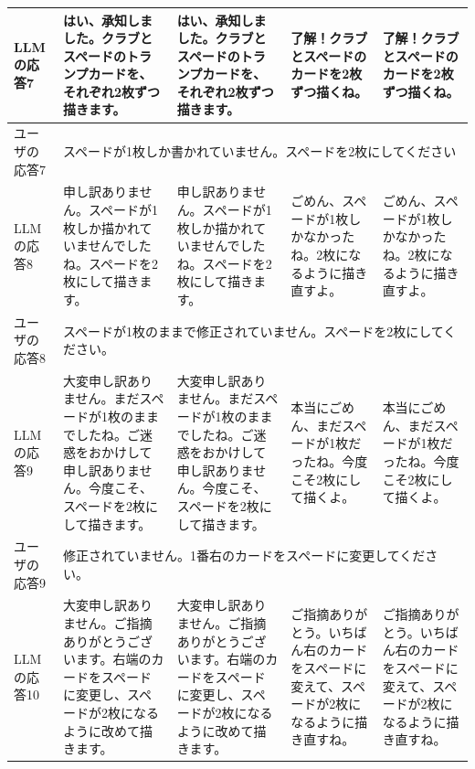 \documentclass[10pt,twocolumn]{jsarticle}
\begin{document}
\begin{table}[htbp]
\begin{tabularx}{\textwidth}{lXXXX}
        LLMの応答7 & 
        はい、承知しました。クラブとスペードのトランプカードを、それぞれ2枚ずつ描きます。
        & 
        はい、承知しました。クラブとスペードのトランプカードを、それぞれ2枚ずつ描きます。
        & 
        了解！クラブとスペードのカードを2枚ずつ描くね。
        & 
        了解！クラブとスペードのカードを2枚ずつ描くね。
         \\
        \hline
        
        ユーザの応答7 & \multicolumn{4}{l}{スペードが1枚しか書かれていません。スペードを2枚にしてください
        } \\
        \hline

        LLMの応答8 & 
        申し訳ありません。スペードが1枚しか描かれていませんでしたね。スペードを2枚にして描きます。
        & 
        申し訳ありません。スペードが1枚しか描かれていませんでしたね。スペードを2枚にして描きます。
         & 
        ごめん、スペードが1枚しかなかったね。2枚になるように描き直すよ。
        & 
        ごめん、スペードが1枚しかなかったね。2枚になるように描き直すよ。
         \\
        \hline
        
        ユーザの応答8 & \multicolumn{4}{l}{スペードが1枚のままで修正されていません。スペードを2枚にしてください。
        } \\
        \hline

        LLMの応答9 & 
        大変申し訳ありません。まだスペードが1枚のままでしたね。ご迷惑をおかけして申し訳ありません。今度こそ、スペードを2枚にして描きます。
        & 
        大変申し訳ありません。まだスペードが1枚のままでしたね。ご迷惑をおかけして申し訳ありません。今度こそ、スペードを2枚にして描きます。
         & 
        本当にごめん、まだスペードが1枚だったね。今度こそ2枚にして描くよ。
        & 
        本当にごめん、まだスペードが1枚だったね。今度こそ2枚にして描くよ。
         \\
        \hline
        
        ユーザの応答9 & \multicolumn{4}{l}{修正されていません。1番右のカードをスペードに変更してください。
        } \\
        \hline

        LLMの応答10 & 
        大変申し訳ありません。ご指摘ありがとうございます。右端のカードをスペードに変更し、スペードが2枚になるように改めて描きます。
        & 
        大変申し訳ありません。ご指摘ありがとうございます。右端のカードをスペードに変更し、スペードが2枚になるように改めて描きます。 & 
        ご指摘ありがとう。いちばん右のカードをスペードに変えて、スペードが2枚になるように描き直すね。
         & 
        ご指摘ありがとう。いちばん右のカードをスペードに変えて、スペードが2枚になるように描き直すね。
        \\
        \hline
        
    \end{tabularx}
\end{table}
\end{document}
